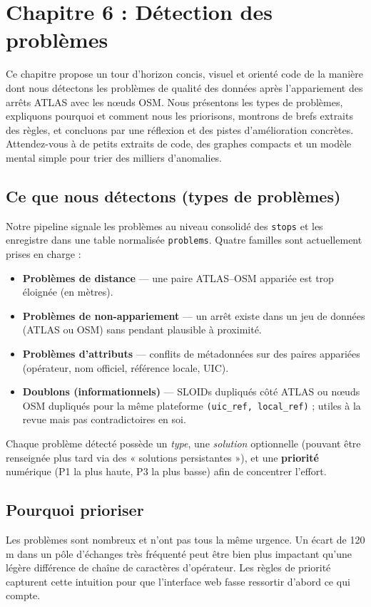 \chapter{Chapitre 6 : Détection des problèmes}

\noindent Ce chapitre propose un tour d'horizon concis, visuel et orienté code de la manière dont nous détectons les problèmes de qualité des données après l'appariement des arrêts ATLAS avec les nœuds OSM. Nous présentons les types de problèmes, expliquons pourquoi et comment nous les priorisons, montrons de brefs extraits des règles, et concluons par une réflexion et des pistes d'amélioration concrètes. Attendez-vous à de petits extraits de code, des graphes compacts et un modèle mental simple pour trier des milliers d'anomalies.

\section{Ce que nous détectons (types de problèmes)}
Notre pipeline signale les problèmes au niveau consolidé des \texttt{stops} et les enregistre dans une table normalisée \texttt{problems}. Quatre familles sont actuellement prises en charge :
\begin{itemize}
  \item \textbf{Problèmes de distance} — une paire ATLAS–OSM appariée est trop éloignée (en mètres).
  \item \textbf{Problèmes de non-appariement} — un arrêt existe dans un jeu de données (ATLAS ou OSM) sans pendant plausible à proximité.
  \item \textbf{Problèmes d'attributs} — conflits de métadonnées sur des paires appariées (opérateur, nom officiel, référence locale, UIC).
  \item \textbf{Doublons (informationnels)} — SLOIDs dupliqués côté ATLAS ou nœuds OSM dupliqués pour la même plateforme \texttt{(uic\_ref, local\_ref)} ; utiles à la revue mais pas contradictoires en soi.
\end{itemize}

Chaque problème détecté possède un \emph{type}, une \emph{solution} optionnelle (pouvant être renseignée plus tard via des « solutions persistantes »), et une \textbf{priorité} numérique (P1 la plus haute, P3 la plus basse) afin de concentrer l'effort.

\section{Pourquoi prioriser}
Les problèmes sont nombreux et n'ont pas tous la même urgence. Un écart de 120 m dans un pôle d'échanges très fréquenté peut être bien plus impactant qu'une légère différence de chaîne de caractères d'opérateur. Les règles de priorité capturent cette intuition pour que l'interface web fasse ressortir d'abord ce qui compte.

